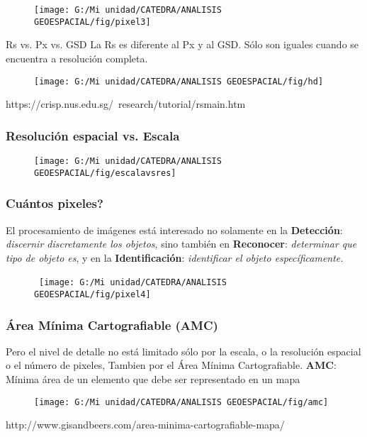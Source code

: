 \documentclass[14pt]{beamer}
\begin{document}
\begin{frame}
 \begin{figure}
    \centering
    \texttt{[image: G:/Mi unidad/CATEDRA/ANALISIS GEOESPACIAL/fig/pixel3]}
  \end{figure}
\end{frame}
\begin{frame}
\begin{exampleblock}{Rs vs. Px vs. GSD}
\small{La Rs es diferente al Px y al GSD. Sólo son iguales cuando se encuentra a resolución completa.}
\end{exampleblock}
 \begin{figure}
    \centering
    \texttt{[image: G:/Mi unidad/CATEDRA/ANALISIS GEOESPACIAL/fig/hd]}
  \end{figure}
\tiny{https://crisp.nus.edu.sg/~research/tutorial/rsmain.htm}
\end{frame}
\begin{frame}
\frametitle{Resolución espacial vs. Escala}
 \begin{figure}
    \centering
    \texttt{[image: G:/Mi unidad/CATEDRA/ANALISIS GEOESPACIAL/fig/escalavsres]}
  \end{figure}
\end{frame}
\begin{frame}
\frametitle{Cuántos pixeles?}
\small{El procesamiento de imágenes está interesado no solamente en la \textbf{Detección}: \emph{discernir discretamente los objetos}, sino también en \textbf{Reconocer}: \emph{determinar que tipo de objeto es}, y en la \textbf{Identificación}: \emph{identificar el objeto específicamente.}}
 \begin{figure}
    \centering
\    \texttt{[image: G:/Mi unidad/CATEDRA/ANALISIS GEOESPACIAL/fig/pixel4]}
  \end{figure}
\end{frame}
\begin{frame}
\frametitle{Área Mínima Cartografiable (AMC)}
\scriptsize{Pero el nivel de detalle no está limitado sólo por la escala, o la resolución espacial o el número de pixeles, Tambien por el Área Mínima Cartografiable.}\vfill
\small{\textbf{AMC}: Mínima área de un elemento que debe ser representado en un mapa}
 \begin{figure}
    \centering
    \texttt{[image: G:/Mi unidad/CATEDRA/ANALISIS GEOESPACIAL/fig/amc]}
  \end{figure}
\tiny{http://www.gisandbeers.com/area-minima-cartografiable-mapa/}
\end{frame}
\end{document}
